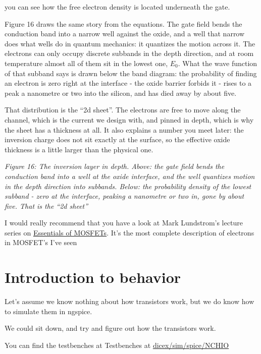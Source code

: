 you can see how the free electron density is located underneath the
gate.

Figure 16 draws the same story from the equations. The gate field bends
the conduction band into a narrow well against the oxide, and a well
that narrow does what wells do in quantum mechanics: it quantizes the
motion across it. The electrons can only occupy discrete subbands in the
depth direction, and at room temperature almost all of them sit in the
lowest one, \(E_0\). What the wave function of that subband says is
drawn below the band diagram: the probability of finding an electron is
zero right at the interface - the oxide barrier forbids it - rises to a
peak a nanometre or two into the silicon, and has died away by about
five.

That distribution is the ``2d sheet''. The electrons are free to move
along the channel, which is the current we design with, and pinned in
depth, which is why the sheet has a thickness at all. It also explains a
number you meet later: the inversion charge does not sit exactly at the
surface, so the effective oxide thickness is a little larger than the
physical one.


{
\centering
{}
}

\emph{Figure 16: The inversion layer in depth. Above: the gate field
bends the conduction band into a well at the oxide interface, and the
well quantizes motion in the depth direction into subbands. Below: the
probability density of the lowest subband - zero at the interface,
peaking a nanometre or two in, gone by about five. That is the ``2d
sheet''}

I would really recommend that you have a look at Mark Lundstrom's
lecture series on
\href{https://www.youtube.com/watch?v=5eG6CvcEHJ8&list=PLtkeUZItwHK6F4a4OpCOaKXKmYBKGWcHi}{Essentials
of MOSFETs}. It's the most complete description of electrons in MOSFET's
I've seen

\section{Introduction to behavior}\label{introduction-to-behavior}

Let's assume we know nothing about how transistors work, but we do know
how to simulate them in ngspice.

We could sit down, and try and figure out how the transistors work.

You can find the testbenches at Testbenches at
\href{https://github.com/wulffern/dicex/tree/main/sim/spice/NCHIO}{dicex/sim/spice/NCHIO}


